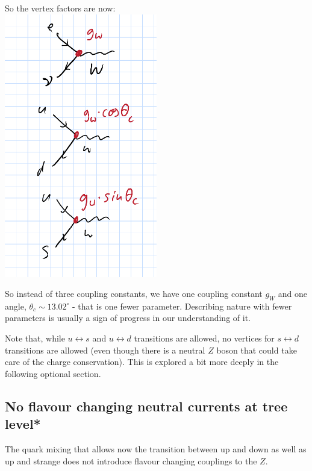  So the vertex factors are now:\\
 \includegraphics[width=0.5\textwidth]{fig/weak/gWCabibbo}
 
 So instead of three coupling constants, we have one coupling constant $g_W$ and one angle, $\theta_c \sim 13.02^{\circ}$ - that is one fewer parameter. Describing nature with fewer parameters is usually a sign of progress in our understanding of it.
 
 Note that, while $u \leftrightarrow s$ and $u \leftrightarrow
 d$ transitions are allowed, no vertices for $s \leftrightarrow d$ transitions are allowed (even though there is a neutral $Z$ boson that could take care of the charge conservation). This is explored a bit more deeply in the following optional section.
\subsection{No flavour changing neutral currents at tree level*}
The quark mixing that allows now the transition between up and down as well as up and strange does not introduce flavour changing couplings to the $Z$.

